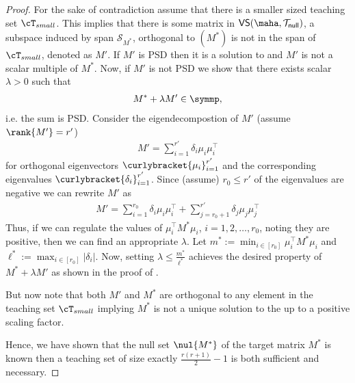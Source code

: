 \begin{proof}
   For the sake of contradiction assume that there is a smaller sized teaching set $\cT_{small}$. This implies that there is some matrix in $\textsf{VS}(\maha,\mathcal{T}_{\sf {null}})$, a subspace induced by span $\mathcal{S}_{M^*}$, orthogonal to $(M^*)$ is not in the span of $\cT_{small}$, denoted as $M'$. If $M'$ is PSD then it is a solution to  and $M'$ is not a scalar multiple of $M^*$. Now, if $M'$ is not PSD we show that there exists scalar $\lambda > 0$ such that
    \begin{align*}
        M^* + \lambda M' \in \symmp,
    \end{align*}
     i.e. the sum is PSD. Consider the eigendecompostion of $M'$ (assume $\rank{M'} = r'$)
     \begin{align*}
         M' = \sum_{i = 1}^{r'} \delta_i\mu_i\mu_i^{\top}
     \end{align*}
     for orthogonal eigenvectors $\curlybracket{\mu_i}_{i=1}^{r'}$ and the corresponding eigenvalues $\curlybracket{\delta_i}_{i=1}^{r'}$. Since (assume) $r_0 \le r'$ of the eigenvalues are negative we can rewrite $M'$ as
     \begin{align*}
         M' = \sum_{i=1}^{r_0} \delta_i \mu_i\mu_i^{\top} + \sum_{j=r_0 + 1}^{r'} \delta_j \mu_j\mu_j^{\top} 
     \end{align*}
     Thus, if we can regulate the values of $\mu^{\top}_iM^*\mu_i$, $i = 1,2,\ldots,r_0$, noting they are positive, then we can find an appropriate $\lambda$. Let $m^* := \min_{i \in [r_0]} \mu_i^{\top}M^*\mu_i$ and $\ell^* := \max_{i \in [r_0]} |\delta_i|$. Now, setting $\lambda \le \frac{m^*}{\ell^*}$ achieves the desired property of $M^* + \lambda M'$ as shown in the proof of . 

     But now note that both $M'$ and $M^*$ are orthogonal to any element in the teaching set $\cT_{small}$ implying $M^*$ is not a unique solution to the  up to a positive scaling factor.

     Hence, we have shown that the null set $\nul{M^*}$ of the target matrix $M^*$ is known then a teaching set of size exactly $\frac{r(r+1)}{2} -1$ is both sufficient and necessary.
\end{proof}

